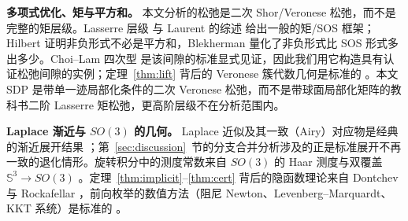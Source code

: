\textbf{多项式优化、矩与平方和。} 本文分析的松弛是二次 Shor/Veronese 松弛，而不是完整的矩层级。Lasserre 层级 \cite{lasserre2001} 与 Laurent 的综述 \cite{laurent2009} 给出一般的矩/SOS 框架；Hilbert \cite{hilbert1888} 证明非负形式不必是平方和，Blekherman \cite{blekherman2006} 量化了非负形式比 SOS 形式多出多少。Choi--Lam 四次型 \cite{choi1977extremal,choi1980zeros} 是该间隙的标准显式见证，因此我们用它构造具有认证松弛间隙的实例；定理~\ref{thm:lift} 背后的 Veronese 簇代数几何是标准的 \cite{harris1992}。本文 SDP 是带单一迹局部化条件的二次 Veronese 松弛，而不是带球面局部化矩阵的教科书二阶 Lasserre 矩松弛，更高阶层级不在分析范围内。

\textbf{Laplace 渐近与 $SO(3)$ 的几何。} Laplace 近似及其一致（Airy）对应物是经典的渐近展开结果 \cite{bleistein1986,wong1989}；第~\ref{sec:discussion}~节的分支合并分析涉及的正是标准展开不再一致的退化情形。旋转积分中的测度常数来自 $SO(3)$ 的 Haar 测度与双覆盖 $\mathbb{S}^3\to SO(3)$ \cite{chirikjian2012}。定理~\ref{thm:implicit}--\ref{thm:cert} 背后的隐函数理论来自 Dontchev 与 Rockafellar \cite{dontchev2009}，前向枚举的数值方法（阻尼 Newton、Levenberg--Marquardt、KKT 系统）是标准的 \cite{nocedal2006}。
